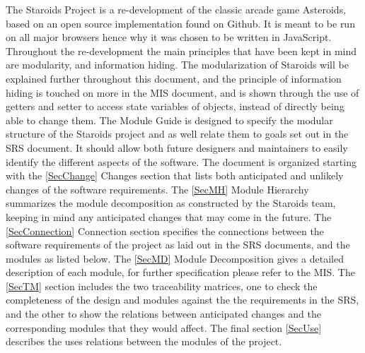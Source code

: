 \documentclass[12pt, titlepage]{article}
\begin{document}
The Staroids Project is a re-development of the classic arcade game Asteroids, based on an open source implementation found on Github. It is meant to be run on all major browsers hence why it was chosen to be written in JavaScript. Throughout the re-development the main principles that have been kept in mind are modularity, and information hiding. The modularization of Staroids will be explained further throughout this document, and the principle of information hiding is touched on more in the MIS document, and is shown through the use of getters and setter to access state variables of objects, instead of directly being able to change them. The Module Guide is designed to specify the modular structure of the Staroids project and as well relate them to goals set out in the SRS document. It should allow both future designers and maintainers to easily identify the different aspects of the software. The document is organized starting with the \ref{SecChange} Changes section that lists both anticipated and unlikely changes of the software requirements. The \ref{SecMH} Module Hierarchy summarizes the module decomposition as constructed by the Staroids team, keeping in mind any anticipated changes that may come in the future. The \ref{SecConnection} Connection section specifies the connections between the software requirements of the project as laid out in the SRS documents, and the modules as listed below. The \ref{SecMD} Module Decomposition gives a detailed description of each module, for further specification please refer to the MIS. The \ref{SecTM} section includes the two traceability matrices, one to check the completeness of the design and modules against the the requirements in the SRS, and the other to show the relations between anticipated changes and the corresponding modules that they would affect. The final section \ref{SecUse} describes the uses relations between the modules of the project.




\end{document}
